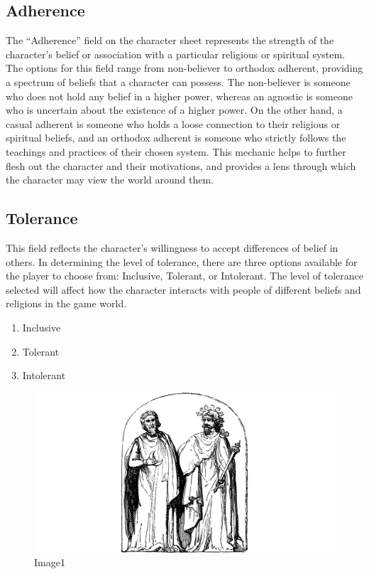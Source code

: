 \hypertarget{adherence}{%
\subsection{Adherence}\label{adherence}}

The ``Adherence'' field on the character sheet represents the strength
of the character's belief or association with a particular religious or
spiritual system. The options for this field range from non-believer to
orthodox adherent, providing a spectrum of beliefs that a character can
possess. The non-believer is someone who does not hold any belief in a
higher power, whereas an agnostic is someone who is uncertain about the
existence of a higher power. On the other hand, a casual adherent is
someone who holds a loose connection to their religious or spiritual
beliefs, and an orthodox adherent is someone who strictly follows the
teachings and practices of their chosen system. This mechanic helps to
further flesh out the character and their motivations, and provides a
lens through which the character may view the world around them.


\hypertarget{tolerance}{%
\subsection{Tolerance}\label{tolerance}}

This field reflects the character's willingness to accept differences of
belief in others. In determining the level of tolerance, there are three
options available for the player to choose from: Inclusive, Tolerant, or
Intolerant. The level of tolerance selected will affect how the
character interacts with people of different beliefs and religions in
the game world.

\begin{enumerate}
\def\labelenumi{\arabic{enumi}.}
\tightlist
\item
  Inclusive
\item
  Tolerant
\item
  Intolerant
\end{enumerate}

\begin{figure}
\centering
\includegraphics{./images/religion03.pdf}
\caption{Image1}
\end{figure}

